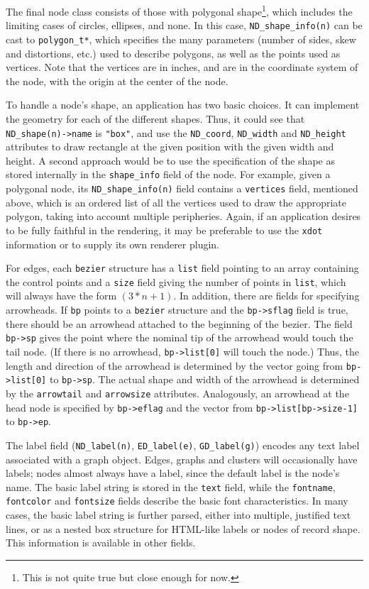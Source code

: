The final node class consists of those with polygonal shape\footnote{This
is not quite true but close enough for now.}, which includes the limiting
cases of circles, ellipses, and none. In this case,
\verb+ND_shape_info(n)+ can be cast to \verb+polygon_t*+, which specifies
the many parameters (number of sides, skew and distortions, etc.)
used to describe polygons, as well as the points used as vertices. 
Note that the vertices are in inches, and are in the coordinate system
of the node, with the origin at the center of the node.

To handle a node's shape, an application has two basic choices. It
can implement the geometry for each of the different shapes.
Thus, it could see that \verb+ND_shape(n)->name+ is {\tt "box"}, and
use the {\tt ND\_coord}, {\tt ND\_width} and {\tt ND\_height} attributes to draw
rectangle at the given position with the given width and  height.
A second approach would be
to use the specification of the shape as stored internally in the
{\tt shape\_info} field of the node. For example, given a polygonal node,
its \verb+ND_shape_info(n)+ field contains a {\tt vertices} field,
mentioned above, which is an ordered list of all the vertices used
to draw the appropriate polygon, taking into account multiple peripheries. 
Again, if an application desires to be fully faithful in the rendering,
it may be preferable to use the {\tt xdot} information or to supply its
own renderer plugin.

For edges, each {\tt bezier} structure has a \verb+list+ field pointing to
an array containing the control points and a \verb+size+ field giving the 
number of points in \verb+list+, which will always have the form $(3*n+1)$. 
In addition, there are
fields for specifying arrowheads. If {\tt bp} points to
a {\tt bezier} structure and the {\tt bp->sflag} field is
true, there should be an arrowhead attached to the beginning of the bezier.
The field {\tt bp->sp} gives the point where the nominal tip of the arrowhead
would touch the tail node. (If there is no arrowhead, {\tt bp->list[0]} will
touch the node.) Thus, the length and direction of the arrowhead
is determined by the vector going from {\tt bp->list[0]} to {\tt bp->sp}. 
The actual
shape and width of the arrowhead is determined by the {\tt arrowtail} and
{\tt arrowsize} attributes. Analogously, an arrowhead at the head node is
specified by {\tt bp->eflag} and the vector 
from {\tt bp->list[bp->size-1]} to {\tt bp->ep}.

The label field (\verb+ND_label(n)+, \verb+ED_label(e)+,
\verb+GD_label(g)+) encodes any text label associated with a graph object.
Edges, graphs and clusters will occasionally have labels; nodes
almost always have a label, since the default label is the node's name.
The basic label string is stored in the {\tt text} field, while the
{\tt fontname}, {\tt fontcolor} and {\tt fontsize} fields describe
the basic font characteristics.
In many cases, the basic label string is further parsed, either into
multiple, justified text lines, or as a nested box structure for
HTML-like labels or nodes of record shape.
This information is available in other fields.

